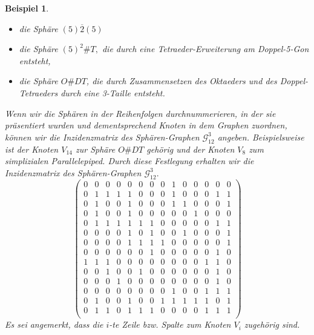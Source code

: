 \documentclass[12pt,titlepage,twoside,cleardoublepage]{article}
\theoremstyle{nummermitklammern}
\newtheorem{bsp}[temp]{Beispiel}
\newtheorem{bsp}[zahl]{Beispiel}
\numberwithin{equation}{section}
\begin{document}
\begin{bsp}
\begin{itemize}
\begin{itemize}
 \item die Sphäre $(5)\overline{2}(5)$
 \item die Sphäre $(5)^2\#T,$ die durch eine Tetraeder-Erweiterung am Doppel-5-Gon entsteht,
 \item die Sphäre $O\# DT$, die durch Zusammensetzen des Oktaeders und des Doppel-Tetraeders durch eine 3-Taille entsteht.
 \end{itemize}
 Wenn wir die Sphären in der Reihenfolgen durchnummerieren, in der sie präsentiert wurden und dementsprechend Knoten in dem Graphen zuordnen, können wir die Inzidenzmatrix des  Sphären-Graphen $\mathcal{G}^3_{12}$ angeben. Beispielsweise ist der Knoten $V_{14}$ zur Sphäre $O\#DT$ gehörig und der Knoten $V_8$ zum simplizialen Parallelepiped. Durch diese Festlegung erhalten wir die Inzidenzmatrix des Sphären-Graphen $\mathcal{G}^3_{12}.$
 \[
\left( \begin{array}{rrrrrrrrrrrrrr}
 0&0&0&0&0&0&0&0&1&0&0&0&0&0\\
 0& 1& 1& 1& 1& 0& 0& 0& 1& 0& 0& 0& 1& 1\\
 0& 1& 0& 0& 1& 0& 0& 0& 1& 1& 0& 0& 0& 1\\
 0& 1& 0& 0& 1& 0& 0& 0& 0& 0& 1& 0& 0& 0 \\
 0& 1& 1& 1& 1& 1& 1& 0& 0& 0& 0& 0& 1& 1 \\
 0& 0& 0& 0& 1& 0& 1& 0& 0& 1& 0& 0& 0& 1\\
 0& 0& 0& 0& 1& 1& 1& 1& 0& 0& 0& 0& 0& 1\\
 0& 0& 0& 0& 0& 0& 1& 0& 0& 0& 0& 0& 1& 0\\
 1& 1& 1& 0& 0& 0& 0& 0& 0& 0& 0& 1& 1& 0\\
 0& 0& 1& 0& 0& 1& 0& 0& 0& 0& 0& 0& 1& 0\\
 0& 0& 0& 1& 0& 0& 0& 0& 0& 0& 0& 0& 1& 0\\
 0& 0& 0& 0& 0& 0& 0& 0& 1& 0& 0& 1& 1& 1\\
 0& 1& 0& 0& 1& 0& 0& 1& 1& 1& 1& 1& 0& 1 \\
 0& 1& 1& 0& 1& 1& 1& 0& 0& 0& 0& 1& 1& 1 \\
\end{array}
\right)
 \]
 Es sei angemerkt, dass die $i$-te Zeile bzw. Spalte zum Knoten $V_i$ zugehörig sind.
 \end{itemize}
 \end{bsp}
\end{document}
